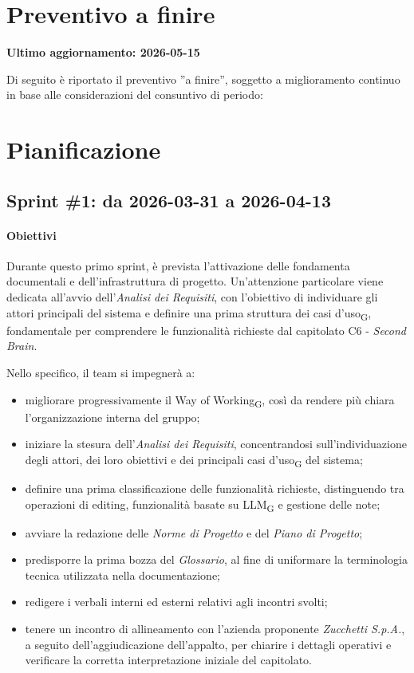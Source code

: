 \documentclass[a4paper, 10pt, colorlinks=true, linkcolor=black, urlcolor=blue, citecolor=blue, hidelinks]{article}
\begin{document}
\section{Preventivo a finire}
\label{tab:preventivo-finire}
\textbf{Ultimo aggiornamento: 2026-05-15}

Di seguito è riportato il preventivo ''a finire'', soggetto a miglioramento continuo in
base alle considerazioni del consuntivo di periodo:


\section{Pianificazione}

\subsection{Sprint \#1: da 2026-03-31 a 2026-04-13}

\paragraph{Obiettivi}
Durante questo primo sprint, è prevista l'attivazione delle fondamenta documentali e dell'infrastruttura di progetto. Un'attenzione particolare viene dedicata all'avvio dell'\textit{Analisi dei Requisiti}, con l'obiettivo di individuare gli attori principali del sistema e definire una prima struttura dei casi d'uso\textsubscript{G}, fondamentale per comprendere le funzionalità richieste dal capitolato C6 - \textit{Second Brain}.

Nello specifico, il team si impegnerà a:
\begin{itemize}
    \item migliorare progressivamente il Way of Working\textsubscript{G}, così da rendere più chiara l'organizzazione interna del gruppo;
    \item iniziare la stesura dell'\textit{Analisi dei Requisiti}, concentrandosi sull'individuazione degli attori, dei loro obiettivi e dei principali casi d'uso\textsubscript{G} del sistema;
    \item definire una prima classificazione delle funzionalità richieste, distinguendo tra operazioni di editing, funzionalità basate su LLM\textsubscript{G} e gestione delle note;
    \item avviare la redazione delle \textit{Norme di Progetto} e del \textit{Piano di Progetto};
    \item predisporre la prima bozza del \textit{Glossario}, al fine di uniformare la terminologia tecnica utilizzata nella documentazione;
    \item redigere i verbali interni ed esterni relativi agli incontri svolti;
    \item tenere un incontro di allineamento con l'azienda proponente \textit{Zucchetti S.p.A.}, a seguito dell'aggiudicazione dell'appalto, per chiarire i dettagli operativi e verificare la corretta interpretazione iniziale del capitolato.
\end{itemize}
\end{document}
